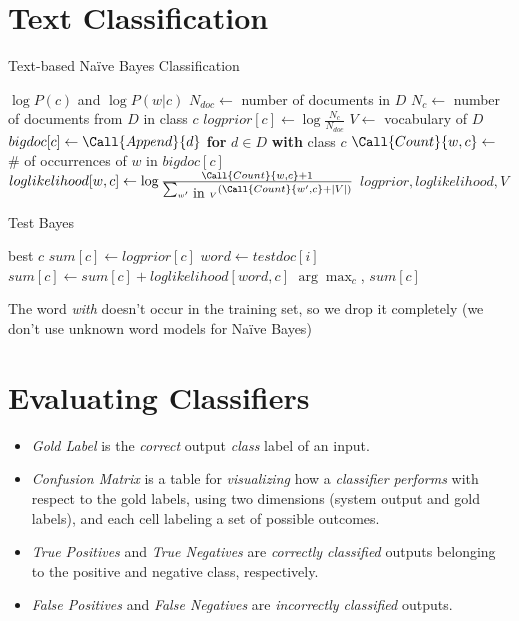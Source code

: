 \documentclass[
	number={3},
	title={Na\"iive Bayes Learning}
]{cs584notes}
\begin{document}
\section{Text Classification}\label{sec:text-classification}
\begin{algorithm}[H]
	\caption{Text-based Naïve Bayes Classification}\label{alg:train-naive-bayes}
	\begin{algorithmic}[1]
		 \Returns $\log P(c)$ and $\log P(w|c)$
				\State $N_{doc} \gets$ number of documents in $D$
				\State $N_{c} \gets$ number of documents from $D$ in class $c$
				\State $logprior[c] \gets \log\frac{N_{c}}{N_{doc}}$
				\State $V \gets $ vocabulary of $D$
				\State $bigdoc[c] \gets \Call{Append}{d}$ \textbf{for} $d\in D$ \textbf{with} class $c$
					\State $\Call{Count}{w,c}\gets $ \# of occurrences of $w$ in $bigdoc[c]$
					\State $loglikelihood[w, c]\gets \log \frac{\Call{Count}{w, c} + 1}{\sum_{w' \mbox{ in } V} (\Call{Count}{w', c} + |V|)} $
				\EndFor
			\EndFor
			\State \Return $logprior, loglikelihood, V$
		\EndFunction
	\end{algorithmic}
\end{algorithm}
\begin{algorithm}[H]
	\caption{Test \Naive Bayes}\label{alg:test-naive-bayes}
	\begin{algorithmic}[1]
	 \Returns best $c$
			\State $sum[c] \gets logprior[c]$
				\State $word \gets testdoc[i]$
					\State $sum[c] \gets sum[c] + loglikelihood[word, c]$
				\EndIf
			\EndFor
		\EndFor
		\State \Return $\arg\max_{c}$, $sum[c]$
	\EndFunction
	\end{algorithmic}
\end{algorithm}

The word \emph{with} doesn't occur in the training set, so we drop it completely (we don't use unknown word models for Naïve Bayes)

\section{Evaluating Classifiers}\label{sec:evaluating-classifiers}
\begin{itemize}
	\item \emph{Gold Label} is the \emph{correct} output \emph{class} label of an input.
	\item \emph{Confusion Matrix} is a table for \emph{visualizing} how a \emph{classifier performs} with respect to the gold labels, using two dimensions (system output and gold labels), and each cell labeling a set of possible outcomes.
	\item \emph{True Positives} and \emph{True Negatives} are \emph{correctly classified} outputs belonging to the positive and negative class, respectively.
	\item \emph{False Positives} and \emph{False Negatives} are \emph{incorrectly classified} outputs.
\end{itemize}
\end{document}
